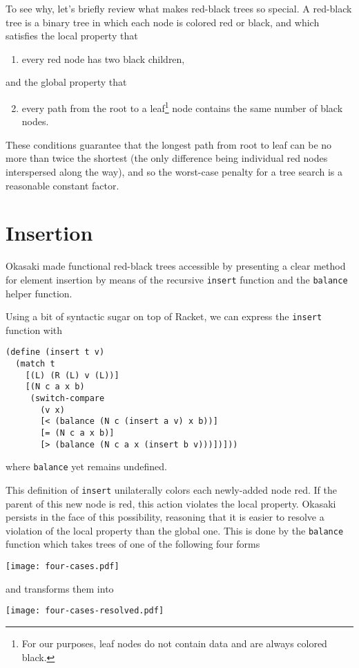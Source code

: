 \documentclass[preprint]{sigplanconf}
\begin{document}
To see why, let's briefly review what makes red-black trees so special. A red-black tree is a binary tree in which each node is colored red or black, and which satisfies the local property that
\begin{enumerate}
\item every red node has two black children,
\end{enumerate}
and the global property that
\begin{enumerate}
\setcounter{enumi}{1}
\item every path from the root to a leaf\footnote{For our purposes, leaf nodes do not contain data and are always colored black.} node contains the same number of black nodes.
\end{enumerate}
These conditions guarantee that the longest path from root to leaf can be no more than twice the shortest (the only difference being individual red nodes interspersed along the way), and so the worst-case penalty for a tree search is a reasonable constant factor.

\section{Insertion}

Okasaki \cite{okasaki1999functional} made functional red-black trees accessible by presenting a clear method for element insertion by means of the recursive \texttt{insert} function and the \texttt{balance} helper function.

Using a bit of syntactic sugar on top of Racket, we can express the \texttt{insert} function with
\begin{verbatim}
(define (insert t v)
  (match t
    [(L) (R (L) v (L))]
    [(N c a x b)
     (switch-compare
       (v x)
       [< (balance (N c (insert a v) x b))]
       [= (N c a x b)]
       [> (balance (N c a x (insert b v)))])]))
\end{verbatim}
where \texttt{balance} yet remains undefined.

This definition of \texttt{insert} unilaterally colors each newly-added node red. If the parent of this new node is red, this action violates the local property. Okasaki persists in the face of this possibility, reasoning that it is easier to resolve a violation of the local property than the global one. This is done by the \texttt{balance} function which takes trees of one of the following four forms
\begin{center}
\texttt{[image: four-cases.pdf]}
\end{center}
and transforms them into
\begin{center}
\texttt{[image: four-cases-resolved.pdf]}
\end{center}
\end{document}
